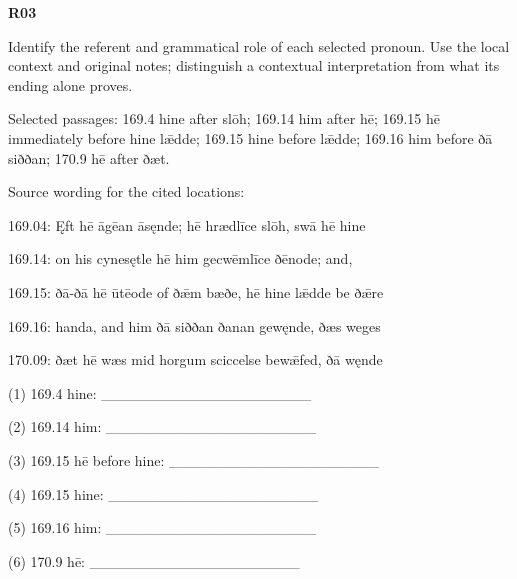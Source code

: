 \par\begin{minipage}{\linewidth}\raggedright
\textbf{R03}

Identify the referent and grammatical role of each selected pronoun. Use the local context and original notes; distinguish a contextual interpretation from what its ending alone proves.

Selected passages: 169.4 hine after slōh; 169.14 him after hē; 169.15 hē immediately before hine lǣdde; 169.15 hine before lǣdde; 169.16 him before ðā siððan; 170.9 hē after ðæt.

Source wording for the cited locations:

169.04: Ęft hē āgēan āsęnde; hē hrædlīce slōh, swā hē hine

169.14: on his cynesętle hē him gecwēmlīce ðēnode; and,

169.15: ðā-ðā hē ūtēode of ðǣm bæðe, hē hine lǣdde be ðǣre

169.16: handa, and him ðā siððan ðanan gewęnde, ðæs weges

170.09: ðæt hē wæs mid horgum sciccelse bewǣfed, ðā węnde

(1) 169.4 hine: \_\_\_\_\_\_\_\_\_\_\_\_\_\_\_\_\_\_\_\_

(2) 169.14 him: \_\_\_\_\_\_\_\_\_\_\_\_\_\_\_\_\_\_\_\_

(3) 169.15 hē before hine: \_\_\_\_\_\_\_\_\_\_\_\_\_\_\_\_\_\_\_\_

(4) 169.15 hine: \_\_\_\_\_\_\_\_\_\_\_\_\_\_\_\_\_\_\_\_

(5) 169.16 him: \_\_\_\_\_\_\_\_\_\_\_\_\_\_\_\_\_\_\_\_

(6) 170.9 hē: \_\_\_\_\_\_\_\_\_\_\_\_\_\_\_\_\_\_\_\_

\end{minipage}\par\addvspace{4pt}

